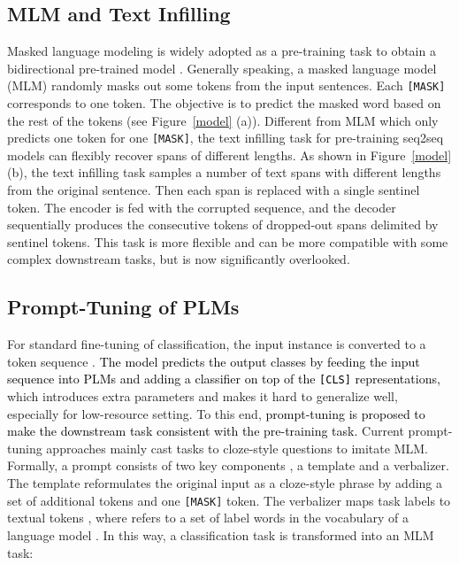 \documentclass[11pt]{article}
\begin{document}
\subsection{MLM and Text Infilling}
Masked language modeling \cite{taylor1953cloze} is widely adopted as a pre-training task to obtain a bidirectional pre-trained model \cite{devlin-etal-2019-bert, DBLP:journals/corr/abs-1907-11692, DBLP:conf/nips/ConneauL19}. Generally speaking, a masked language model (MLM) randomly masks out some tokens from the input sentences. Each \texttt{[MASK]} corresponds to one token. The objective is to predict the masked word based on the rest of the tokens (see Figure~\ref{model} (a)). Different from MLM which only predicts one token for one \texttt{[MASK]}, the text infilling task for pre-training seq2seq models \cite{DBLP:journals/jmlr/RaffelSRLNMZLL20, lewis-etal-2020-bart} can flexibly recover spans of different lengths. As shown in Figure~\ref{model} (b), the text infilling task samples a number of text spans with different lengths from the original sentence. Then each span is replaced with a single sentinel token. The encoder is fed with the corrupted sequence, and the decoder sequentially produces the consecutive tokens of dropped-out spans delimited by sentinel tokens. This task is more flexible and can be more compatible with some complex downstream tasks, but is now significantly overlooked.










\begin{comment}
	
\end{comment}



\subsection{Prompt-Tuning of PLMs}

For standard fine-tuning of classification, the input instance  is converted to a token sequence . \textcolor{black}{The model predicts the output classes by feeding the input sequence into PLMs and adding a classifier on top of the \texttt{[CLS]} representations, }which introduces extra parameters and makes it hard to generalize well, especially for low-resource setting. To this end, \textcolor{black}{prompt-tuning is proposed to make the downstream task consistent with the pre-training task.} Current prompt-tuning approaches mainly cast tasks to cloze-style questions to imitate MLM.
Formally, a prompt consists of two key components \cite{schick-schutze-2021-exploiting}, a template and a verbalizer. The template  reformulates the original input  as a cloze-style phrase   by adding a set of additional tokens and one \texttt{[MASK]} token. The verbalizer  maps task labels  to textual tokens , where  refers to a set of
label words in the vocabulary of a language model . In this way, a classification task is transformed into an MLM task:
\end{document}
